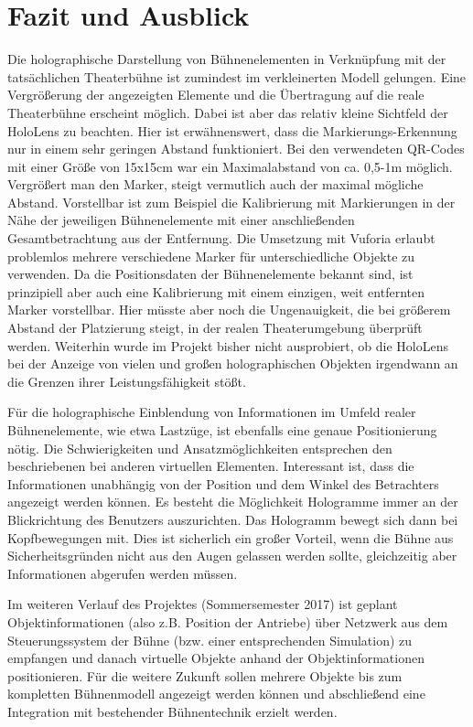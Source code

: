 \documentclass[conference, 11pt]{IEEEtran}
\begin{document}
\section{Fazit und Ausblick}

Die holographische Darstellung von Bühnenelementen in Verknüpfung mit der tatsächlichen Theaterbühne ist zumindest im verkleinerten Modell gelungen. Eine Vergrößerung der angezeigten Elemente und die Übertragung auf die reale Theaterbühne erscheint möglich. Dabei ist aber das relativ kleine Sichtfeld der HoloLens zu beachten. Hier ist erwähnenswert, dass die Markierungs-Erkennung nur in einem sehr geringen Abstand funktioniert. Bei den verwendeten QR-Codes mit einer Größe von 15x15cm war ein Maximalabstand von ca. 0,5-1m möglich. Vergrößert man den Marker, steigt vermutlich auch der maximal mögliche Abstand. Vorstellbar ist zum Beispiel die Kalibrierung mit Markierungen in der Nähe der jeweiligen Bühnenelemente mit einer anschließenden Gesamtbetrachtung aus der Entfernung. Die Umsetzung mit Vuforia erlaubt problemlos mehrere verschiedene Marker für unterschiedliche Objekte zu verwenden. Da die Positionsdaten der Bühnenelemente bekannt sind, ist prinzipiell aber auch eine Kalibrierung mit einem einzigen, weit entfernten Marker vorstellbar. Hier müsste aber noch die Ungenauigkeit, die bei größerem Abstand der Platzierung steigt, in der realen Theaterumgebung überprüft werden. Weiterhin wurde im Projekt bisher nicht ausprobiert, ob die HoloLens bei der Anzeige von vielen und großen holographischen Objekten irgendwann an die Grenzen ihrer Leistungsfähigkeit stößt. \par
Für die holographische Einblendung von Informationen im Umfeld realer Bühnenelemente, wie etwa Lastzüge, ist ebenfalls eine genaue Positionierung nötig. Die Schwierigkeiten und Ansatzmöglichkeiten entsprechen den beschriebenen bei anderen virtuellen Elementen. Interessant ist, dass die Informationen unabhängig von der Position und dem Winkel des Betrachters angezeigt werden können. Es besteht die Möglichkeit Hologramme immer an der Blickrichtung des Benutzers auszurichten. Das Hologramm bewegt sich dann bei Kopfbewegungen mit. Dies ist sicherlich ein großer Vorteil, wenn die Bühne aus Sicherheitsgründen nicht aus den Augen gelassen werden sollte, gleichzeitig aber Informationen abgerufen werden müssen. \par
Im weiteren Verlauf des Projektes (Sommersemester 2017) ist geplant Objektinformationen (also z.B. Position der Antriebe) über Netzwerk aus dem Steuerungssystem der Bühne (bzw. einer entsprechenden Simulation) zu empfangen und danach virtuelle Objekte anhand der Objektinformationen positionieren. Für die weitere Zukunft sollen mehrere Objekte bis zum kompletten Bühnenmodell angezeigt werden können und abschließend eine Integration mit bestehender Bühnentechnik erzielt werden.   









\end{document}
